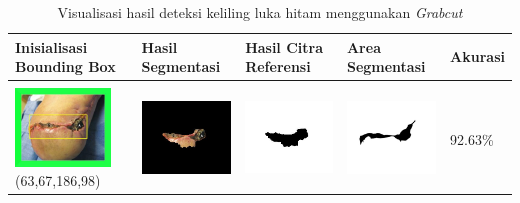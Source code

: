 \begin{table}[H]
	\centering
	\caption{Visualisasi hasil deteksi keliling luka hitam menggunakan \emph{Grabcut}}
	\label{tabel_hasil_5}
	\begin{tabular}{|m{1.0in}|m{1.0in}|m{1.0in}|m{1.0in}|m{0.6in}|}
		\hline
		\textbf{Inisialisasi Bounding Box} & \textbf{Hasil Segmentasi} & \textbf{Hasil Citra Referensi} & \textbf{Area Segmentasi} & \textbf{Akurasi} \\
		\hline

		&  &  & \\
		\includegraphics[width=1.0in]{gambar/hasil_segmentasi/luka_hitam/image_16_rect.jpg} {\centering\fontsize{10}{10}\selectfont(63,67,186,98)}&
		\includegraphics[width=1.0in]{gambar/hasil_segmentasi/luka_hitam/result_16.jpg}&
		\includegraphics[width=1.0in]{gambar/hasil_segmentasi/luka_hitam/mask_r_16.jpg}&
		\includegraphics[width=1.0in]{gambar/hasil_segmentasi/luka_hitam/16_r.jpg}&
		92.63\% \\
		\hline 


\end{tabular}
\end{table}
